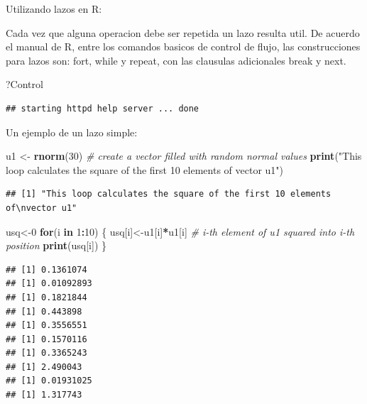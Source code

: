 \documentclass[ignorenonframetext,]{beamer}
\newenvironment{Shaded}{\begin{snugshade}}{\end{snugshade}}
\newcommand{\KeywordTok}[1]{\textcolor[rgb]{0.13,0.29,0.53}{\textbf{#1}}}
\newcommand{\DecValTok}[1]{\textcolor[rgb]{0.00,0.00,0.81}{#1}}
\newcommand{\StringTok}[1]{\textcolor[rgb]{0.31,0.60,0.02}{#1}}
\newcommand{\CommentTok}[1]{\textcolor[rgb]{0.56,0.35,0.01}{\textit{#1}}}
\newcommand{\ControlFlowTok}[1]{\textcolor[rgb]{0.13,0.29,0.53}{\textbf{#1}}}
\newcommand{\OperatorTok}[1]{\textcolor[rgb]{0.81,0.36,0.00}{\textbf{#1}}}
\newcommand{\NormalTok}[1]{#1}
\begin{document}
\begin{frame}[fragile]

\begin{block}{Utilizando lazos en R:}

Cada vez que alguna operacion debe ser repetida un lazo resulta util. De
acuerdo el manual de R, entre los comandos basicos de control de flujo,
las construcciones para lazos son: fort, while y repeat, con las
clausulas adicionales break y next.

\begin{Shaded}
\begin{Highlighting}[]
\NormalTok{?Control}
\end{Highlighting}
\end{Shaded}

\begin{verbatim}
## starting httpd help server ... done
\end{verbatim}

Un ejemplo de un lazo simple:

\begin{Shaded}
\begin{Highlighting}[]
\NormalTok{u1 <-}\StringTok{ }\KeywordTok{rnorm}\NormalTok{(}\DecValTok{30}\NormalTok{) }\CommentTok{# create a vector filled with random normal values}
\KeywordTok{print}\NormalTok{(}\StringTok{"This loop calculates the square of the first 10 elements of}
\StringTok{vector u1"}\NormalTok{)}
\end{Highlighting}
\end{Shaded}

\begin{verbatim}
## [1] "This loop calculates the square of the first 10 elements of\nvector u1"
\end{verbatim}

\begin{Shaded}
\begin{Highlighting}[]
\NormalTok{usq<-}\DecValTok{0}
\ControlFlowTok{for}\NormalTok{(i }\ControlFlowTok{in} \DecValTok{1}\OperatorTok{:}\DecValTok{10}\NormalTok{)}
\NormalTok{\{}
\NormalTok{usq[i]<-u1[i]}\OperatorTok{*}\NormalTok{u1[i] }\CommentTok{# i-th element of u1 squared into i-th position}
\KeywordTok{print}\NormalTok{(usq[i])}
\NormalTok{\}}
\end{Highlighting}
\end{Shaded}

\begin{verbatim}
## [1] 0.1361074
## [1] 0.01092893
## [1] 0.1821844
## [1] 0.443898
## [1] 0.3556551
## [1] 0.1570116
## [1] 0.3365243
## [1] 2.490043
## [1] 0.01931025
## [1] 1.317743
\end{verbatim}


\end{block}
\end{frame}
\end{document}
